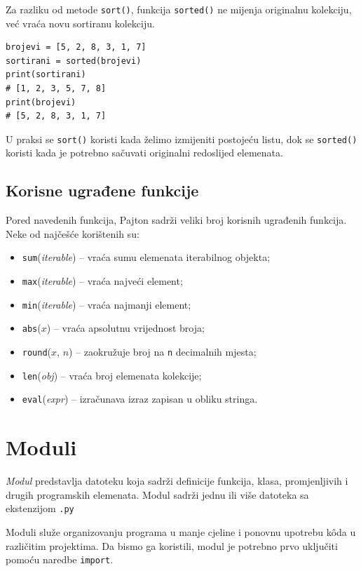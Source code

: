 Za razliku od metode \texttt{sort()}, funkcija \texttt{sorted()} ne mijenja originalnu kolekciju, već vraća novu sortiranu kolekciju.

\begin{verbatim}
brojevi = [5, 2, 8, 3, 1, 7]
sortirani = sorted(brojevi)
print(sortirani)
# [1, 2, 3, 5, 7, 8]
print(brojevi)
# [5, 2, 8, 3, 1, 7]
\end{verbatim}

U praksi se \texttt{sort()} koristi kada želimo izmijeniti postojeću listu, dok se \texttt{sorted()} koristi kada je potrebno sačuvati originalni redoslijed elemenata.

\subsection{Korisne ugrađene funkcije}

Pored navedenih funkcija, Pajton sadrži veliki broj korisnih ugrađenih funkcija. Neke od najčešće korištenih su:

\begin{itemize}
	\item \texttt{sum}(\emph{iterable}) -- vraća sumu elemenata iterabilnog objekta;
	\item \texttt{max}(\emph{iterable}) -- vraća najveći element;
	\item \texttt{min}(\emph{iterable}) -- vraća najmanji element;
	\item \texttt{abs}($x$) -- vraća apsolutnu vrijednost broja;
	\item \texttt{round}($x$, $n$) -- zaokružuje broj na \texttt{n} decimalnih mjesta;
	\item \texttt{len}(\emph{obj}) -- vraća broj elemenata kolekcije;
	\item \texttt{eval}(\emph{expr}) -- izračunava izraz zapisan u obliku stringa.
\end{itemize}

\section{Moduli}

\textit{Modul} predstavlja datoteku koja sadrži definicije funkcija, klasa, promjenljivih i drugih programskih elemenata. Modul sadrži jednu ili više datoteka sa ekstenzijom \texttt{.py} %

Moduli služe organizovanju programa u manje cjeline i ponovnu upotrebu k\^oda u različitim projektima. Da bismo ga koristili, modul je potrebno prvo uključiti pomoću naredbe \texttt{import}.

